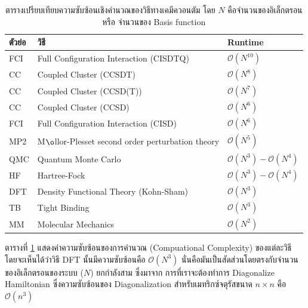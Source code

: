 \begin{table}[H]
    \centering
    \caption{ตารางเปรียบเทียบความซับซ้อนเชิงคำนวณของวิธีทางเคมีควอนตัม\autocite{rupp2015} โดย $N$ คือจำนวนของอิเล็กตรอนหรือ%
    จำนวนของ Basis function}
    \label{tab:qm_complx}
    \small
    \begin{tabular}{lll}\toprule
    ตัวย่อ &วิธี &Runtime \\\midrule
    FCI &Full Configuration Interaction (CISDTQ) &$\mathcal{O}(N^{10})$ \\
    CC &Coupled Cluster (CCSDT) &$\mathcal{O}(N^{8})$ \\
    CC &Coupled Cluster (CCSD(T)) &$\mathcal{O}(N^{7})$ \\
    CC &Coupled Cluster (CCSD) &$\mathcal{O}(N^{6})$ \\
    FCI &Full Configuration Interaction (CISD) &$\mathcal{O}(N^{6})$ \\
    MP2 &M$\o$llor-Plesset second order perturbation theory &$\mathcal{O}(N^{5})$ \\
    QMC &Quantum Monte Carlo &$\mathcal{O}(N^{3}) - \mathcal{O}(N^{4})$ \\
    HF &Hartree-Fock &$\mathcal{O}(N^{3}) - \mathcal{O}(N^{4})$ \\
    DFT &Density Functional Theory (Kohn-Sham) &$\mathcal{O}(N^{3})$ \\
    TB &Tight Binding &$\mathcal{O}(N^{3})$ \\
    MM &Molecular Mechanics &$\mathcal{O}(N^{2})$ \\
    \bottomrule
    \end{tabular}
\end{table}

ตารางที่ \ref{tab:qm_complx} แสดงค่าความซับซ้อนของการคำนวณ (Compuational Complexity) ของแต่ละวิธี โดยจะเห็นได้ว่าวิธี DFT 
นั้นมีความซับซ้อนคือ $\mathcal{O}(N^{3})$ นั่นคือมันเป็นสัดส่วนโดยตรงกับจำนวนของอิเล็กตรอนของระบบ ($N$) ยกกำลังสาม ซึ่งมาจาก%
การที่เราจะต้องทำการ Diagonalize Hamiltonian ซึ่งความซับซ้อนของ Diagonalization สำหรับเมทริกซ์จตุรัสขนาด $n \times n$ คือ 
$\mathcal{O}(n^{3})$

